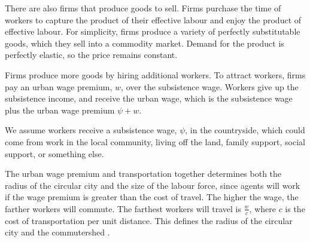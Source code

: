 There are also firms that produce goods to sell. 
Firms purchase the time of workers to capture the product of their effective labour and enjoy the product of \gls{effective labour}. 
For simplicity, firms produce a variety of perfectly \gls{substitutable} goods, which they sell into a commodity market. %
Demand for the \gls{product} is \gls{perfectly elastic}, so the price remains constant.

Firms produce more goods by hiring additional workers. To attract workers, firms pay an \gls{urban wage premium}, $w$, over the subsistence wage. 
Workers give up the subsistence income, and receive the \gls{urban wage}, which is the subsistence wage plus the urban wage premium $\psi + w$.

 
We assume workers receive a \gls{subsistence wage}, $\psi$, in the countryside, which could come from work in the local community, living off the land, family support, social support, or something else. %

The {urban wage premium} and transportation together determines both the radius of the circular city and the size of the labour force, %
since agents will work if the wage premium is greater than the cost of travel. %
The higher the wage, the  farther workers will commute.
The farthest workers will travel  is $\frac{w}{{c}}$, where ${c}$ is the cost of transportation per unit distance. This defines the radius of the circular city and the commutershed .

